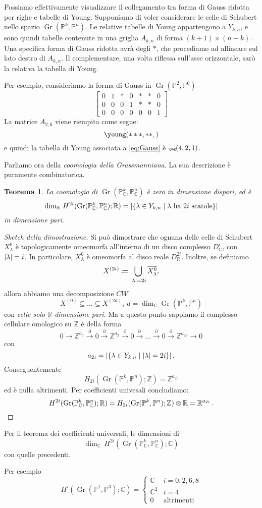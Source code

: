 \documentclass[a4paper, 11pt]{article}
\theoremstyle{definition}
\theoremstyle{plain}
\newtheorem{Teo}[Def]{Teorema}
\DeclarePairedDelimiter{\abs}{\lvert}{\rvert}
\newcommand{\PP}{\mathbb{P}}
\newcommand{\R}{\mathbb{R}}
\newcommand{\C}{\mathbb{C}}
\newcommand{\Z}{\mathbb{Z}}
\newcommand{\deff}{\coloneqq}
\DeclareMathOperator{\Gr}{Gr}
\begin{document}
Possiamo effettivamente visualizzare il collegamento tra forma di Gauss ridotta per righe e tabelle di Young. Supponiamo di voler considerare le celle di Schubert nello spazio $\Gr(\PP^k, \PP^n)$. Le relative tabelle di Young appartengono a $Y_{k,n}$, e sono quindi tabelle contenute in una griglia $A_{k,n}$ di forma $(k+1)\times (n-k)$. Una specifica forma di Gauss ridotta avrà degli $*$, che procediamo ad allineare sul lato destro di $A_{k,n}$. Il complementare, una volta riflessa sull'asse orizzontale, sarò la relativa la tabella di Young. 

Per esempio, consideriamo la forma di Gauss in $\Gr(\PP^2, \PP^6)$
\[
	\begin{bmatrix}
		0 & 1 & * & 0 & * & * & 0 \\
		0 & 0 & 0 & 1 & * & * & 0 \\
		0 & 0 & 0 & 0 & 0 & 0 & 1
	\end{bmatrix}	
\]
La matrice $A_{2,6}$ viene riempita come segue:
\begin{equation}\label{eq:Gauss}
	\young(\hfil ***,\hfil\hfil **,\hfil\hfil\hfil\hfil)
\end{equation}
e quindi la tabella di Young associata a \eqref{eq:Gauss} è $\tiny \yng(4,2,1)$.\vspace{1ex}

Parliamo ora della \emph{coomologia della Grassmanniana}. La sua descrizione è puramente combinatorica.
\begin{Teo}
	La coomologia di $\Gr(\PP^k_\C, \PP^n_\C)$ è zero in dimensione dispari, ed è
	\[
		\dim_\R\,H^{2i}(\Gr(\PP^k_\C, \PP^n_\C); \R) = \abs{\{\lambda \in Y_{k,n}\mid \lambda \text{ ha $2i$ scatole}\}}
	\]
	in dimensione pari.
\end{Teo}
\begin{proof}[Sketch della dimostrazione]
	Si può dimostrare che ognuna delle celle di Schubert $X^0_\lambda$ è topologicamente omeomorfa all'interno di un disco complesso $D_\C^i$, con $\abs{\lambda} = i$. In particolare, $X^0_\lambda$ è omeomorfa al disco reale $D_\R^{2i}$. Inoltre, se definiamo
	\[
		X^{(2i)} \deff \bigcup_{\abs{\lambda} = 2i} \overline{X^0_\lambda},
	\]
	allora abbiamo una decomposizione $CW$
	\[	
		X^{(0)} \subseteq \dots \subseteq X^{(2d)},\ d = \dim_\C \Gr(\PP^k, \PP^n)
	\]
	con \emph{celle solo $\R$-dimensione pari}. Ma a questo punto sappiamo il complesso cellulare omologico su $\Z$ è della forma
	\[
		0 \to \Z^{a_0} \overset{\partial}{\to} 0 \overset{\partial}{\to} \Z^{a_2} \overset{\partial}{\to} 0 \overset{\partial}{\to} \dots \overset{\partial}{\to} 0 \overset{\partial}{\to} \Z^{a_{2d}} \to 0 
	\]
	con 
	\[
		a_{2i} = \abs{\{\lambda \in Y_{k,n} \mid \abs{\lambda} = 2i\}}\,.
	\]
	Conseguentemente 
	\[
		H_{2i}(\Gr(\PP^k, \PP^n);\Z) = \Z^{a_{2i}}
	\]
	ed è nulla altrimenti. Per coefficienti univesali concludiamo:
	\[
		H^{2i}(\Gr(\PP^k_\C, \PP^n_\C); \R) = H_{2i}(\Gr(\PP^k, \PP^n);\Z) \otimes \R = \R^{a_{2i}}\,. \qedhere
	\]
\end{proof}
Per il teorema dei coefficienti universali, le dimensioni di 
\[
	\dim_\C\,H^{2i}(\Gr(\PP^k_\C, \PP^n_\C); \C)
\]
con quelle precedenti.

Per esempio
\[
	H^i(\Gr(\PP^1, \PP^3);\C) = 
	\begin{cases}
		\C & i = 0,2,6,8\\
		\C^2 & i = 4\\
		0 &\text{altrimenti}
	\end{cases}
\]
\end{document}
